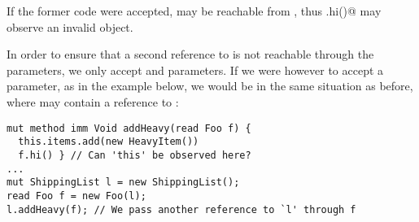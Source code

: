If the former code were accepted, 
\Q@this@ may be reachable from \Q@f@, thus \Q@f.hi()@ may observe an invalid object.

In order to ensure that a second reference to \Q@this@ is not reachable through the parameters, we only accept \Q@imm@ and \Q@capsule@ parameters.
If we were however to accept a \Q@read@ parameter, as in the example below,
we would be in the same situation as before, where \Q@f@ may contain
a reference to \Q@this@:
\begin{lstlisting}
mut method imm Void addHeavy(read Foo f) {
  this.items.add(new HeavyItem())
  f.hi() } // Can 'this' be observed here?
...
mut ShippingList l = new ShippingList();
read Foo f = new Foo(l);
l.addHeavy(f); // We pass another reference to `l' through f
\end{lstlisting}



